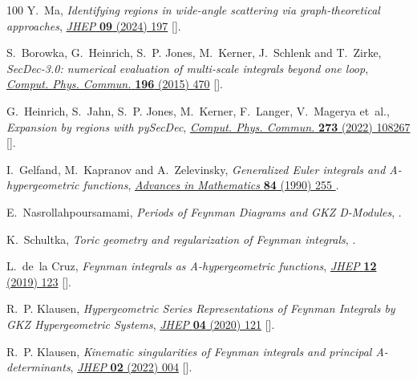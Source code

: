 \documentclass[12pt,a4paper]{article}
\theoremstyle{plain}
\theoremstyle{remark}
\begin{document}
\begin{thebibliography}{100}
Y.~Ma, \emph{{Identifying regions in wide-angle scattering via
  graph-theoretical approaches}},
  \href{https://doi.org/10.1007/JHEP09(2024)197}{\emph{JHEP} {\bfseries 09}
  (2024) 197} [\href{https://arxiv.org/abs/2312.14012}{{}}].

S.~Borowka, G.~Heinrich, S.~P. Jones, M.~Kerner, J.~Schlenk and T.~Zirke,
  \emph{{SecDec-3.0: numerical evaluation of multi-scale integrals beyond one
  loop}}, \href{https://doi.org/10.1016/j.cpc.2015.05.022}{\emph{Comput. Phys.
  Commun.} {\bfseries 196} (2015) 470}
  [\href{https://arxiv.org/abs/1502.06595}{{}}].

G.~Heinrich, S.~Jahn, S.~P. Jones, M.~Kerner, F.~Langer, V.~Magerya et~al.,
  \emph{{Expansion by regions with pySecDec}},
  \href{https://doi.org/10.1016/j.cpc.2021.108267}{\emph{Comput. Phys. Commun.}
  {\bfseries 273} (2022) 108267}
  [\href{https://arxiv.org/abs/2108.10807}{{}}].

I.~Gelfand, M.~Kapranov and A.~Zelevinsky, \emph{Generalized {E}uler integrals
  and {A}-hypergeometric functions},
  \href{https://doi.org/https://doi.org/10.1016/0001-8708(90)90048-R}{\emph{Advances
  in Mathematics} {\bfseries 84} (1990) 255 }.

E.~{Nasrollahpoursamami}, \emph{{Periods of Feynman Diagrams and GKZ
  D-Modules}},  \href{https://arxiv.org/abs/1605.04970}{{}}.

K.~Schultka, \emph{{Toric geometry and regularization of Feynman integrals}},
  \href{https://arxiv.org/abs/1806.01086}{{}}.

L.~de~la Cruz, \emph{{Feynman integrals as A-hypergeometric functions}},
  \href{https://doi.org/10.1007/JHEP12(2019)123}{\emph{JHEP} {\bfseries 12}
  (2019) 123} [\href{https://arxiv.org/abs/1907.00507}{{}}].

R.~P. Klausen, \emph{{Hypergeometric Series Representations of Feynman
  Integrals by GKZ Hypergeometric Systems}},
  \href{https://doi.org/10.1007/JHEP04(2020)121}{\emph{JHEP} {\bfseries 04}
  (2020) 121} [\href{https://arxiv.org/abs/1910.08651}{{}}].

R.~P. Klausen, \emph{{Kinematic singularities of Feynman integrals and
  principal A-determinants}},
  \href{https://doi.org/10.1007/JHEP02(2022)004}{\emph{JHEP} {\bfseries 02}
  (2022) 004} [\href{https://arxiv.org/abs/2109.07584}{{}}].


\end{thebibliography}
\end{document}
